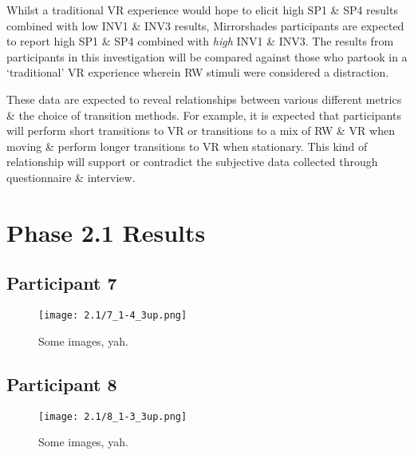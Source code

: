 Whilst a traditional VR experience would hope to elicit high SP1 \& SP4 results combined with low INV1 \& INV3 results, Mirrorshades participants are expected to report high SP1 \& SP4 combined with \textit{high} INV1 \& INV3. The results from participants in this investigation will be compared against those who partook in a `traditional' VR experience wherein RW stimuli were considered a distraction.







These data are expected to reveal relationships between various different metrics \& the choice of transition methods. For example, it is expected that participants will perform short transitions to VR or transitions to a mix of RW \& VR when moving \& perform longer transitions to VR when stationary. This kind of relationship will support or contradict the subjective data collected through questionnaire \& interview.

\section{Phase 2.1 Results}


\clearpage

\subsection{Participant 7}

\begin{figure}[h]
	\begin{center}
	\texttt{[image: 2.1/7\_1-4\_3up.png]}
	\caption{Some images, yah.}
	\end{center}
\end{figure}


\clearpage

\subsection{Participant 8}

\begin{figure}[h]
	\begin{center}
	\texttt{[image: 2.1/8\_1-3\_3up.png]}
	\caption{Some images, yah.}
	\end{center}
\end{figure}

